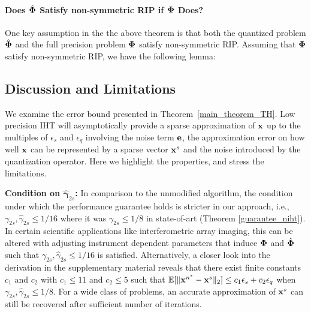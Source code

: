 \documentclass{article}
\begin{document}
\vspace{-0.5em}
\paragraph*{Does $\hat{\bf \Phi}$ Satisfy 
non-symmetric RIP if $\bf \Phi$ Does?} One key assumption
in the the above theorem is that both the quantized
problem $\hat{\bf \Phi}$ and the full precision 
problem $\bf \Phi$ satisfy non-symmetric RIP.
Assuming that $\bf \Phi$ satisfy non-symmetric RIP, 
we have the following lemma: 


\vspace{-0.5em}
\subsection{Discussion and Limitations}
\vspace{-1em}

We examine the error bound presented in Theorem~\ref{main_theorem_TH}. Low precision IHT will asymptotically provide a sparse approximation of ${\bf x}$ up to the multiples of $ {\epsilon}_s$ and $ {\epsilon}_q$ involving the noise term ${\bf e}$, the approximation error on how well ${\bf x}$ can be represented by a sparse vector ${\bf x}^s$ and the noise introduced by the quantization operator. 
Here we highlight the properties, and stress the limitations.

{\bf Condition on $\hat{\boldsymbol{\gamma}}_{2s}$:} In comparison to the unmodified algorithm, the condition under which the performance guarantee holds is stricter in our approach, i.e., ${\gamma}_{2s}, \hat{\gamma}_{2s}\leq 1/16$ where it was ${\gamma}_{2s}\leq 1/8$ in state-of-art (Theorem \ref{guarantee_niht}). In certain scientific applications like interferometric array imaging, this can be altered with adjusting instrument dependent parameters that induce ${\bf \Phi}$ and $\hat{\bf \Phi}$ such that ${\gamma}_{2s}, \hat{\gamma}_{2s}\leq 1/16$ is satisfied. Alternatively, a closer look into the derivation in the supplementary material reveals that there exist finite constants $c_1$ and $c_2$ with $c_1\leq 11$ and $c_2\leq 5$ such that $\mathbb{E}[\|{\bf x}^{n^*}-{\bf x}^s \|_2] \leq c_1\epsilon_s + c_2\epsilon_q$ when ${\gamma}_{2s}, \hat{\gamma}_{2s}\leq 1/8$. For a wide class of problems, an accurate approximation of ${\bf x}^s$ can still be recovered after sufficient number of iterations.
\end{document}

